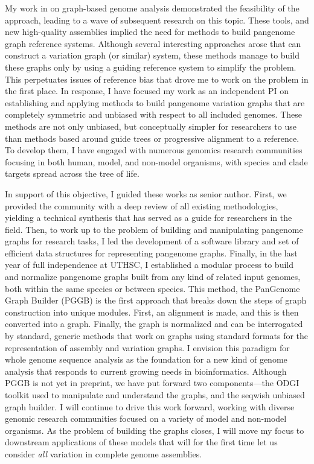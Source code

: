 \documentclass{nihbiosketch}
\begin{document}
\begin{enumerate}
  My work in on graph-based genome analysis demonstrated the feasibility of the approach, leading to a wave of subsequent research on this topic.
  These tools, and new high-quality assemblies implied the need for methods to build pangenome graph reference systems.
  Although several interesting approaches arose that can construct a variation graph (or similar) system, these methods manage to build these graphs only by using a guiding reference system to simplify the problem.
  This perpetuates issues of reference bias that drove me to work on the problem in the first place.
  In response, I have focused my work as an independent PI on establishing and applying methods to build pangenome variation graphs that are completely symmetric and unbiased with respect to all included genomes.
  These methods are not only unbiased, but conceptually simpler for researchers to use than methods based around guide trees or progressive alignment to a reference.
  To develop them, I have engaged with numerous genomics research communities focusing in both human, model, and non-model organisms, with species and clade targets spread across the tree of life.

  In support of this objective, I guided these works as senior author.
  First, we provided the community with a deep review of all existing methodologies, yielding a technical synthesis that has served as a guide for researchers in the field.
  Then, to work up to the problem of building and manipulating pangenome graphs for research tasks, I led the development of a software library and set of efficient data structures for representing pangenome graphs.
  Finally, in the last year of full independence at UTHSC, I established a modular process to build and normalize pangenome graphs built from any kind of related input genomes, both within the same species or between species.
  This method, the PanGenome Graph Builder (PGGB) is the first approach that breaks down the steps of graph construction into unique modules.
  First, an alignment is made, and this is then converted into a graph.
  Finally, the graph is normalized and can be interrogated by standard, generic methods that work on graphs using standard formats for the representation of assembly and variation graphs.
  I envision this paradigm for whole genome sequence analysis as the foundation for a new kind of genome analysis that responds to current growing needs in bioinformatics.
  Although PGGB is not yet in preprint, we have put forward two components---the ODGI toolkit used to manipulate and understand the graphs, and the seqwish unbiased graph builder.
  I will continue to drive this work forward, working with diverse genomic research communities focused on a variety of model and non-model organisms.
  As the problem of building the graphs closes, I will move my focus to downstream applications of these models that will for the first time let us consider \textit{all} variation in complete genome assemblies.
  

\end{enumerate}
\end{document}
